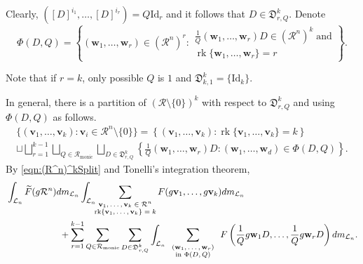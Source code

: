 \documentclass[11pt,a4paper,reqno]{amsart}
\newcommand{\Rmo}{\mathcal R_{\text{monic}}}
\theoremstyle{definition}
\theoremstyle{remark}
\numberwithin{equation}{section}
\begin{document}
Clearly, $([D]^{i_1},\dots,[D]^{i_r})=Q\mathrm{Id}_r$ and it follows that $D\in\mathfrak{D}^k_{r,Q}$. Denote
\begin{equation}\label{Def: Phi}
\Phi(D,Q)=\left\{(\mathbf{w}_1,\dots,\mathbf{w}_r)\in (\mathcal R^n)^r:\begin{matrix}\frac{1}{Q}(\mathbf{w}_1,\dots,\mathbf{w}_r)D\in(\mathcal{R}^n)^k\;\text{and}\\ 
\operatorname{rk}\{\mathbf{w}_1,\dots,\mathbf{w}_r\}=r\end{matrix}\right\}.
\end{equation}

Note that if $r=k$, only possible $Q$ is $1$ and $\mathfrak{D}^k_{k,1}=\{\mathrm{Id}_k\}$. 

In general, there is a partition of $(\mathcal{R}\setminus\{0\})^k$ with respect to $\mathfrak{D}^k_{r,Q}$ and using $\Phi(D,Q)$ as follows.
\begin{equation}
\begin{split}
\label{eqn:(R^n)^kSplit}
    \{(\mathbf{v}_1,\dots,\mathbf{v}_k):\mathbf{v}_i\in \mathcal{R}^n\setminus \{0\}\}= \left\{(\mathbf{v}_1,\dots,\mathbf{v}_k):\operatorname{rk}\{\mathbf{v}_1,\dots,\mathbf{v}_k\}=k\right\}\\
    \sqcup\bigsqcup_{r=1}^{k-1}\bigsqcup_{Q\in \Rmo}\bigsqcup_{D\in \mathfrak{D}^k_{r,Q}}\left\{\frac{1}{Q}(\mathbf{w}_1,\dots,\mathbf{w}_r)D:(\mathbf{w}_1,\dots,\mathbf{w}_d)\in \Phi(D,Q)\right\}.
\end{split}
\end{equation}
By \eqref{eqn:(R^n)^kSplit} and Tonelli's integration theorem, 
\begin{equation}
    \begin{split}
    &\int_{\mathcal{L}_n}\widetilde{F}(g\mathcal R^n) dm_{\mathcal{L}_n}
    \int_{\mathcal{L}_n} \hspace{-0.05in}\sum_{\scriptsize \begin{matrix}
        \mathbf{v}_1,\dots,\mathbf{v}_k\in \mathcal{R}^n\\
        \operatorname{rk}\{\mathbf{v}_1,\dots,\mathbf{v}_k\}=k
    \end{matrix}}F(g\mathbf{v}_1,\dots,g\mathbf{v}_k)dm_{\mathcal{L}_n}\\
    &\hspace{0.8in}+\sum_{r=1}^{k-1}\sum_{Q\in\Rmo}\sum_{D\in \mathfrak{D}^k_{r,Q}}
    \int_{\mathcal{L}_n}\sum_{\scriptsize \begin{array}{c}
    (\mathbf w_1, \ldots, \mathbf w_r)\\
    \text{in }\Phi(D,Q)\end{array}}
    F\left(\frac{1}{Q}g\mathbf{w}_1D,\dots,\frac{1}{Q}g\mathbf{w}_rD\right)dm_{\mathcal{L}_n}.
    \end{split}
\end{equation}
\end{document}
